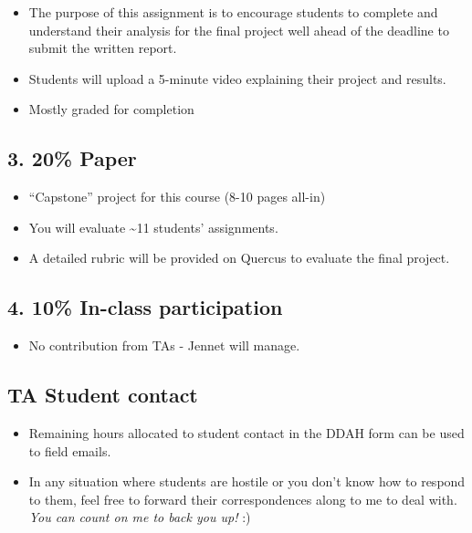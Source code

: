 \documentclass[
]{book}
\providecommand{\tightlist}{%
  \setlength{\itemsep}{0pt}\setlength{\parskip}{0pt}}
\begin{document}
\begin{itemize}
\tightlist
\item
  The purpose of this assignment is to encourage students to complete and understand their analysis for the final project well ahead of the deadline to submit the written report.
\item
  Students will upload a 5-minute video explaining their project and results.
\item
  Mostly graded for completion
\end{itemize}

\subsection*{3. 20\% Paper}\label{paper}

\begin{itemize}
\tightlist
\item
  ``Capstone'' project for this course (8-10 pages all-in)
\item
  You will evaluate \textasciitilde11 students' assignments.
\item
  A detailed rubric will be provided on Quercus to evaluate the final project.
\end{itemize}

\subsection*{4. 10\% In-class participation}\label{in-class-participation}

\begin{itemize}
\tightlist
\item
  No contribution from TAs - Jennet will manage.
\end{itemize}

\subsection*{TA Student contact}\label{ta-student-contact}

\begin{itemize}
\item
  Remaining hours allocated to student contact in the DDAH form can be used to field emails.
\item
  In any situation where students are hostile or you don't know how to respond to them, feel free to forward their correspondences along to me to deal with. \emph{You can count on me to back you up!} :)
\end{itemize}
\end{document}
